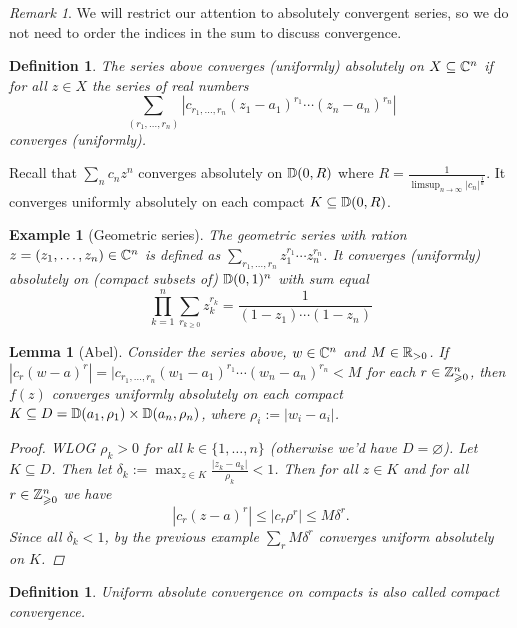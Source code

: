 \documentclass[A4paper, british, reqno]{amsart}
\theoremstyle{darkgreentheorem}
\newtheorem{lm}[thm]{Lemma}
\theoremstyle{darkbluedefinition}
\newtheorem{defn}[thm]{Definition}
\theoremstyle{darkredexample}
\newtheorem{exa}[thm]{Example}
\theoremstyle{remark}
\newtheorem{rem}[thm]{Remark}
\newcommand{\1}{\mathbbm{1}}
\begin{document}
\begin{rem}
    We will restrict our attention to absolutely convergent series, so we do not need to order the indices in the sum to discuss convergence.
\end{rem}

\begin{defn}
    The series above \textit{converges (uniformly) absolutely} on $X\subseteq \mathbb{C}^{n}$ if for all $z\in X$ the series of real numbers
    \[\sum_{(r_{1},\ldots,r_{n})} |c_{r_{1},\ldots,r_{n}}(z_{1}-a_{1})^{r_{1}}\cdots (z_{n}-a_{n})^{r_{n}}| \]
    converges (uniformly).
\end{defn}

Recall that $\sum_{n}c_{n}z^{n}$ converges absolutely on $\mathbb{D}(0,R)$ where $R=\frac{1}{\operatorname{limsup}_{n\to\infty}{|c_{n}|^{\frac{1}{n}}}}$.
It converges uniformly absolutely on each compact $K\subseteq \mathbb{D}(0,R)$.

\begin{exa}[Geometric series]
    The geometric series with ration $z=(z_{1},\ldots,z_{n})\in \mathbb{C}^{n}$ is defined as $\sum_{r_{1},\ldots,r_{n}}z_{1}^{r_{1}}\cdots z_{n}^{r_{n}}$.
    It converges (uniformly) absolutely on (compact subsets of) $\mathbb{D}(0,1)^{n}$ with sum equal
    \[ \prod_{k=1}^{n}\sum_{r_{k\geqslant 0}}z_{k}^{r_{k}}=\frac{1}{(1-z_{1})\cdots (1-z_{n})} \]
\end{exa}

\begin{lm}[Abel]
    Consider the series above, $w\in \mathbb{C}^{n}$ and $M\in \mathbb{R}_{>0}$.
    If $|c_{r}(w-a)^{r}|=|c_{r_{1},\ldots,r_{n}}(w_{1}-a_{1})^{r_{1}}\cdots (w_{n}-a_{n})^{r_{n}}<M$ for each $r\in \mathbb{Z}^{n}_{\geqslant 0}$, then $f(z)$ converges uniformly absolutely on each compact $K\subseteq D=\mathbb{D}(a_{1},\rho_{1})\times \mathbb{D}(a_{n},\rho_{n})$, where $\rho_{i}:=|w_{i}-a_{i}|$.
    \begin{proof}
	WLOG $\rho_{k}>0$ for all $k\in \{1,\ldots,n\}$ (otherwise we'd have $D=\varnothing$).
	Let $K\subseteq D$.
	Then let $\delta_{k}:=\max_{z\in K}\frac{|z_{k}-a_{k}|}{\rho_{k}}<1 $.
	Then for all $z\in K$ and for all $r\in \mathbb{Z}^{n}_{\geqslant 0}$ we have
	\[ |c_{r}(z-a)^{r}|\leqslant |c_{r}\rho^{r}|\leqslant M\delta^{r}.\]
	Since all $\delta_{k}<1$, by the previous example $\sum_{r}M\delta^{r}$ converges uniform absolutely on $K$.
    \end{proof}
\end{lm}

\begin{defn}
    Uniform absolute convergence on compacts is also called \textit{compact convergence}.
\end{defn}
\end{document}
